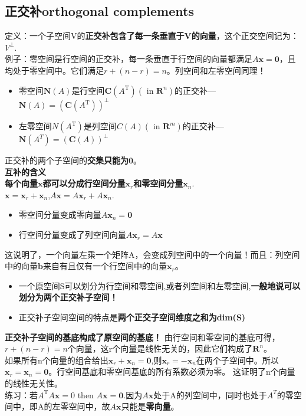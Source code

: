     \subsection{正交补orthogonal complements}
    定义：一个子空间V的\textbf{正交补包含了每一条垂直于V的向量}，这个正交空间记为：$V^\perp$.\\
    例子：零空间是行空间的正交补，每一条垂直于行空间的向量都满足$A\bm{x}=\bm{0}$，且均处于零空间中。它们满足$r+(n-r)=n$。列空间和左零空间同理！
    \\
    \begin{itemize}
        \item 零空间$\mathbf{N}(A)$是行空间$\boldsymbol{C}\left(A^{\mathrm{T}}\right)\left(\text { in } \mathbf{R}^{n}\right)$的正交补---$\mathbf{N}(A) = (\boldsymbol{C}\left(A^{\mathrm{T}}\right))^\perp$
        \item 左零空间$N\left(A^{\mathrm{T}}\right)$是列空间$C(A)\left(\text { in } \mathbf{R}^{m}\right)$的正交补---$\mathbf{N}(A^T) = (\boldsymbol{C}\left(A\right))^\perp$
    \end{itemize}
    正交补的两个子空间的\textbf{交集只能为}$\bm{0}$。 \\
    \textbf{互补的含义}\\
    \textbf{每个向量$\bm{x}$都可以分成行空间分量$\bm{x}_r$和零空间分量$\bm{x}_n$}.\\
    $\boldsymbol{x}=\boldsymbol{x}_{r}+\boldsymbol{x}_{n}$,\quad $A \boldsymbol{x}=A \boldsymbol{x}_{r}+A \boldsymbol{x}_{n}$.
    \begin{itemize}
        \item 零空间分量变成零向量$A \boldsymbol{x}_{n}=\mathbf{0}$
        \item 行空间分量变成了列空间向量$A \boldsymbol{x}_{r}=A \boldsymbol{x}$
    \end{itemize}
    这说明了，一个向量左乘一个矩阵A，会变成列空间中的一个向量！而且：列空间中的向量$\bm{b}$来自有且仅有一个行空间中的向量$\bm{x}_r$。
    \\
    \begin{itemize}
        \item 一个原空间S可以划分为行空间和零空间,或者列空间和左零空间,\textbf{一般地说可以划分为两个正交补子空间！}
        \item 正交补子空间空间的特点是\textbf{两个正交子空间维度之和为dim(S)}
    \end{itemize}
    \textbf{正交补子空间的基底构成了原空间的基底！}
    由行空间和零空间的基底可得，$r+(n-r)=n$个向量，这r个向量是线性无关的，因此它们构成了$\mathbf{R}^{n}$。
    \\
    如果所有n个向量的组合给出$\boldsymbol{x}_{r}+\boldsymbol{x}_{n}=\mathbf{0}$,则$\boldsymbol{x}_{r}=-\boldsymbol{x}_{n}$在两个子空间中。所以$\boldsymbol{x}_{r}=\boldsymbol{x}_{n}=\bm{0}$。行空间基底和零空间基底的所有系数必须为零。 这证明了n个向量的线性无关性。
    \\
    练习：若$A^{\mathrm{T}} A \boldsymbol{x}=0$ then $A \boldsymbol{x}=\mathbf{0}$.\quad 因为$A \boldsymbol{x}$处于A的列空间中，同时也处于$A^T$的零空间中，即A的左零空间中，故$A \boldsymbol{x}$只能是\textbf{零向量}。

